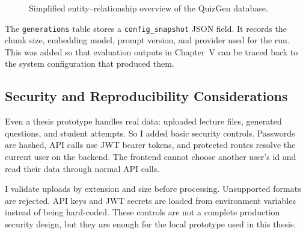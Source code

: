 \documentclass[12pt,a4paper]{article}
\begin{document}
\begin{figure}[H]
  \centering
  \singlespacing
  \caption{Simplified entity--relationship overview of the QuizGen database.}
  \label{fig:er-diagram}
\end{figure}

The \texttt{generations} table stores a \texttt{config\_snapshot} JSON
field. It records the chunk size, embedding model, prompt version, and
provider used for the run. This was added so that evaluation outputs in
Chapter~V can be traced back to the system configuration that produced
them.

\subsection{Security and Reproducibility Considerations}

Even a thesis prototype handles real data: uploaded lecture files,
generated questions, and student attempts. So I added basic security
controls. Passwords are hashed, API calls use JWT bearer
tokens, and protected routes resolve the current user on the backend. The
frontend cannot choose another user's id and read their data through normal
API calls.

I validate uploads by extension and size before processing.
Unsupported formats are rejected. API keys and JWT secrets are loaded from
environment variables instead of being hard-coded. These controls are not a
complete production security design, but they are enough for the local
prototype used in this thesis.
\end{document}
